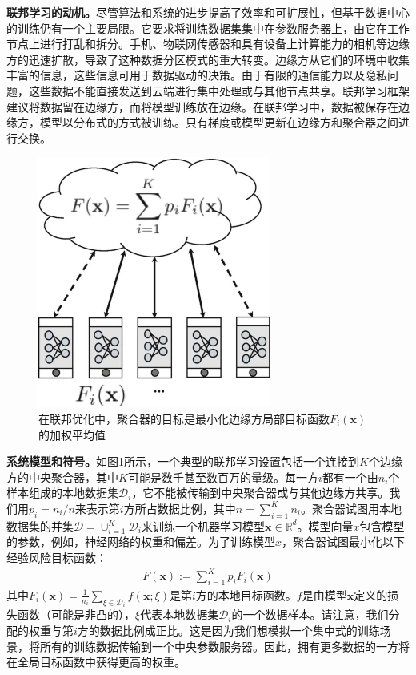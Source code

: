 \textbf{联邦学习的动机。}尽管算法和系统的进步提高了效率和可扩展性，但基于数据中心的训练仍有一个主要局限。它要求将训练数据集集中在参数服务器上，由它在工作节点上进行打乱和拆分。手机、物联网传感器和具有设备上计算能力的相机等边缘方的迅速扩散，导致了这种数据分区模式的重大转变。边缘方从它们的环境中收集丰富的信息，这些信息可用于数据驱动的决策。由于有限的通信能力以及隐私问题，这些数据不能直接发送到云端进行集中处理或与其他节点共享。联邦学习框架建议将数据留在边缘方，而将模型训练放在边缘。在联邦学习中，数据被保存在边缘方，模型以分布式的方式被训练。只有梯度或模型更新在边缘方和聚合器之间进行交换。

\begin{figure}[h]
	\centering
	\includegraphics{chapter06/images/Fig1}
	\caption{在联邦优化中，聚合器的目标是最小化边缘方局部目标函数$F_{i}(\bm{x})$的加权平均值}
	\label{fig:6.1}
\end{figure}

\textbf{系统模型和符号。}如图\ref{fig:6.1}所示，一个典型的联邦学习设置包括一个连接到$K$个边缘方的中央聚合器，其中$K$可能是数千甚至数百万的量级。每一方$i$都有一个由$n_{i}$个样本组成的本地数据集$\mathcal{D}_{i}$，它不能被传输到中央聚合器或与其他边缘方共享。我们用$p_{i} = n_{i}/n$来表示第$i$方所占数据比例，其中$n=\sum_{i=1}^{K}n_{i}$。聚合器试图用本地数据集的并集$\mathcal{D} = \cup_{i=1}^{K}\mathcal{D}_{i}$来训练一个机器学习模型$\bm{x} \in \mathbb{R}^{d}$。模型向量$x$包含模型的参数，例如，神经网络的权重和偏差。为了训练模型$x$，聚合器试图最小化以下经验风险目标函数：
\begin{align}
	F(\bm{x}) := \sum_{i=1}^{K}p_{i}F_{i}(\bm{x})
\end{align}
其中$F_{i}(\bm{x}) = \frac{1}{n_{i}}\sum_{\xi \in \mathcal{D}_{i}} f(\bm{x};\xi)$是第$i$方的本地目标函数。$f$是由模型$\bm{x}$定义的损失函数（可能是非凸的），$\xi$代表本地数据集$\mathcal{D}_{i}$的一个数据样本。请注意，我们分配的权重与第$i$方的数据比例成正比。这是因为我们想模拟一个集中式的训练场景，将所有的训练数据传输到一个中央参数服务器。因此，拥有更多数据的一方将在全局目标函数中获得更高的权重。

